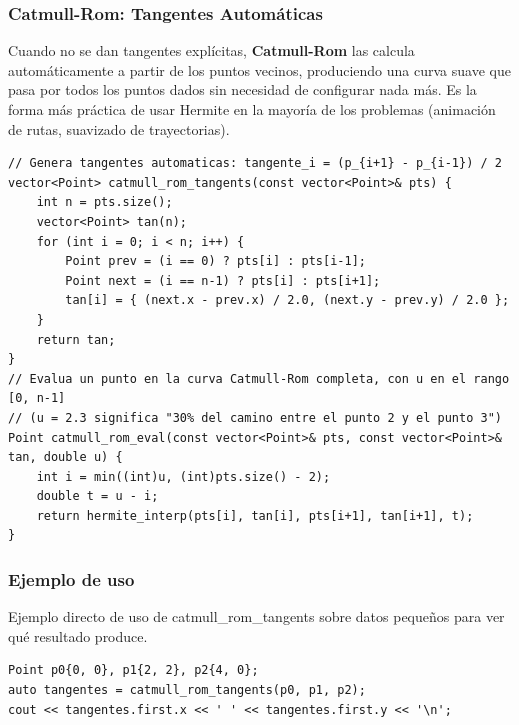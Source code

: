 \documentclass[10pt,twocolumn,letterpaper]{report}
\begin{document}
\subsubsection{Catmull-Rom: Tangentes Automáticas}
Cuando no se dan tangentes explícitas, \textbf{Catmull-Rom} las calcula automáticamente a partir de los puntos vecinos, produciendo una curva suave que pasa por todos los puntos dados sin necesidad de configurar nada más. Es la forma más práctica de usar Hermite en la mayoría de los problemas (animación de rutas, suavizado de trayectorias).
\begin{lstlisting}
// Genera tangentes automaticas: tangente_i = (p_{i+1} - p_{i-1}) / 2
vector<Point> catmull_rom_tangents(const vector<Point>& pts) {
    int n = pts.size();
    vector<Point> tan(n);
    for (int i = 0; i < n; i++) {
        Point prev = (i == 0) ? pts[i] : pts[i-1];
        Point next = (i == n-1) ? pts[i] : pts[i+1];
        tan[i] = { (next.x - prev.x) / 2.0, (next.y - prev.y) / 2.0 };
    }
    return tan;
}
// Evalua un punto en la curva Catmull-Rom completa, con u en el rango [0, n-1]
// (u = 2.3 significa "30% del camino entre el punto 2 y el punto 3")
Point catmull_rom_eval(const vector<Point>& pts, const vector<Point>& tan, double u) {
    int i = min((int)u, (int)pts.size() - 2);
    double t = u - i;
    return hermite_interp(pts[i], tan[i], pts[i+1], tan[i+1], t);
}
\end{lstlisting}
\subsubsection*{Ejemplo de uso}
Ejemplo directo de uso de catmull\_rom\_tangents sobre datos pequeños para ver qué resultado produce.
\begin{lstlisting}
Point p0{0, 0}, p1{2, 2}, p2{4, 0};
auto tangentes = catmull_rom_tangents(p0, p1, p2);
cout << tangentes.first.x << ' ' << tangentes.first.y << '\n';
\end{lstlisting}
\end{document}
